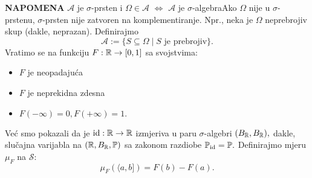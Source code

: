 \documentclass{article}
\newcommand{\id}{\operatorname{id}}
\begin{document}
\textbf{NAPOMENA}\newline
\(\mathcal A\) je \(\sigma\)-prsten i \(\Omega\in\mathcal A\) \(\Leftrightarrow\) \(\mathcal A\) je \(\sigma\)-algebra\newline Ako \(\Omega\) nije u \(\sigma\)-prstenu,  \(\sigma\)-prsten nije zatvoren na komplementiranje. Npr., neka je \(\Omega\) neprebrojiv skup (dakle, neprazan). Definirajmo \[\mathcal A:=\{S\subseteq\Omega\mid S\text{ je prebrojiv}\}.\]
Vratimo se na funkciju \(F:\Bbb R\to[0,1]\) sa svojstvima:
\begin{itemize}
    \item[\ding{113}] \(F\) je neopadajuća
    \item[\ding{113}] \(F\) je neprekidna zdesna
    \item[\ding{113}] \(F(-\infty)=0, F(+\infty)=1.\)
\end{itemize}
Već smo pokazali da je \(\id:\Bbb R\to\Bbb R\) izmjeriva u paru \(\sigma\)-algebri \((B_\Bbb R, B_\Bbb R), \) dakle, slučajna varijabla na \((\Bbb R,B_\Bbb R,\Bbb P)\) sa zakonom razdiobe \(\Bbb P_{\id}=\Bbb P.\)\newline\newline
Definirajmo mjeru \(\mu_F\) na \(\mathcal S\): \[\mu_F\left(\langle a,b]\right)=F(b)-F(a).\]
\end{document}
